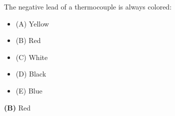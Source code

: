 

The negative lead of a thermocouple is always colored:

\begin{itemize}
\item{(A)} Yellow
\vskip 5pt 
\item{(B)} Red
\vskip 5pt 
\item{(C)} White
\vskip 5pt 
\item{(D)} Black
\vskip 5pt 
\item{(E)} Blue
\end{itemize}







{\bf (B)} Red
 









